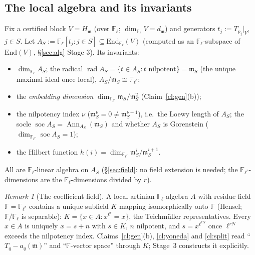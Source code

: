 \documentclass[11pt]{article}
\theoremstyle{remark}
\newtheorem{remark}[theorem]{Remark}
\newcommand{\F}{\mathbb{F}}
\newcommand{\End}{\mathrm{End}}
\newcommand{\Fl}{\F_\ell}
\newcommand{\Flr}{\F_{\ell^r}}
\DeclareMathOperator{\soc}{soc}
\DeclareMathOperator{\rad}{rad}
\DeclareMathOperator{\Ann}{Ann}
\newcommand{\m}{\mathfrak{m}}
\begin{document}
\subsection{The local algebra and its invariants}\label{sec:localalg}
Fix a certified block $V=H_\m$ (over $\Fl$; $\dim_{\Fl}V=d_\m$) and generators
$t_j:=T_{p_j}|_V$, $j\in S$. Let $A_S:=\Fl[t_j:j\in S]\subseteq\End_{\Fl}(V)$ (computed as an
$\Fl$-subspace of $\End(V)$, \S\ref{sec:alg} Stage 3). Its invariants:
\begin{itemize}
\item $\dim_{\Fl}A_S$; the radical $\rad A_S=\{t\in A_S:t\text{ nilpotent}\}=\m_S$ (the unique
  maximal ideal once local), $A_S/\m_S\cong\Flr$;
\item the \emph{embedding dimension} $\dim_{\Flr}\m_S/\m_S^2$ (Claim~\ref{cl:gen}(b));
\item the nilpotency index $\nu$ ($\m_S^\nu=0\ne\m_S^{\nu-1}$), i.e.\ the Loewy length of
  $A_S$; the socle $\soc A_S=\Ann_{A_S}(\m_S)$ and whether $A_S$ is Gorenstein
  ($\dim_{\Flr}\soc A_S=1$);
\item the Hilbert function $h(i)=\dim_{\Flr}\m_S^i/\m_S^{i+1}$.
\end{itemize}
All are $\Fl$-linear algebra on $A_S$ (\S\ref{sec:field}: no field extension is needed; the
$\Flr$-dimensions are the $\Fl$-dimensions divided by $r$).

\begin{remark}[The coefficient field]\label{rmk:coef}
A local artinian $\Fl$-algebra $A$ with residue field $\F=\Flr$ contains a unique subfield $K$
mapping isomorphically onto $\F$ (Hensel; $\F/\Fl$ is separable): $K=\{x\in A:x^{\ell^r}=x\}$,
the Teichm\"uller representatives. Every $x\in A$ is uniquely $x=s+n$ with $s\in K$, $n$
nilpotent, and $s=x^{\ell^{rN}}$ once $\ell^{rN}$ exceeds the nilpotency index.
Claims~\ref{cl:gen}(b), \ref{cl:yoneda} and \ref{cl:split} read ``$T_q-a_q(\m)$'' and
``$\F$-vector space'' through $K$; Stage~3 constructs it explicitly.
\end{remark}
\end{document}
